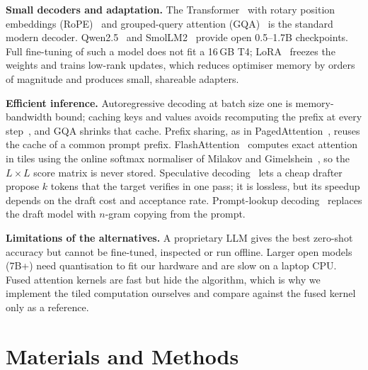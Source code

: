 \documentclass[conference]{IEEEtran}
\begin{document}
\textbf{Small decoders and adaptation.} The Transformer~\cite{vaswani2017attention} with rotary position embeddings (RoPE)~\cite{su2024roformer} and grouped-query attention (GQA)~\cite{ainslie2023gqa} is the standard modern decoder. Qwen2.5~\cite{qwen2025report} and SmolLM2~\cite{allal2025smollm2} provide open 0.5--1.7B checkpoints. Full fine-tuning of such a model does not fit a 16\,GB T4; LoRA~\cite{hu2022lora} freezes the weights and trains low-rank updates, which reduces optimiser memory by orders of magnitude and produces small, shareable adapters.

\textbf{Efficient inference.} Autoregressive decoding at batch size one is memory-bandwidth bound; caching keys and values avoids recomputing the prefix at every step~\cite{pope2023efficiently}, and GQA shrinks that cache. Prefix sharing, as in PagedAttention~\cite{kwon2023paged}, reuses the cache of a common prompt prefix. FlashAttention~\cite{dao2022flashattention} computes exact attention in tiles using the online softmax normaliser of Milakov and Gimelshein~\cite{milakov2018online}, so the $L\times L$ score matrix is never stored. Speculative decoding~\cite{leviathan2023fast,chen2023accelerating} lets a cheap drafter propose $k$ tokens that the target verifies in one pass; it is lossless, but its speedup depends on the draft cost and acceptance rate. Prompt-lookup decoding~\cite{saxena2023prompt} replaces the draft model with $n$-gram copying from the prompt.

\textbf{Limitations of the alternatives.} A proprietary LLM gives the best zero-shot accuracy but cannot be fine-tuned, inspected or run offline. Larger open models (7B+) need quantisation to fit our hardware and are slow on a laptop CPU. Fused attention kernels are fast but hide the algorithm, which is why we implement the tiled computation ourselves and compare against the fused kernel only as a reference.

\section{Materials and Methods}
\end{document}
